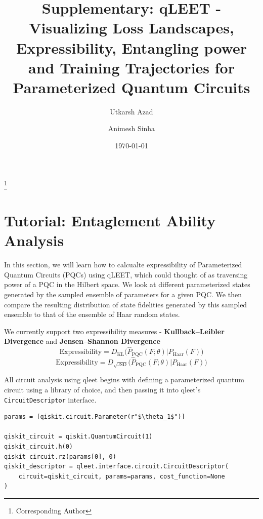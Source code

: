 \documentclass[%
 reprint,
 amsmath,
 amssymb,
 showkeys,
 pra,
 floatfix,
 onecolumn,
]{revtex4-2}
\begin{document}
\title{Supplementary: qLEET - Visualizing Loss Landscapes, Expressibility, Entangling power and Training Trajectories for Parameterized Quantum Circuits}

\author{Utkarsh Azad}
\thanks{Corresponding Author}
\author{Animesh Sinha}
\date{\today}

\maketitle

\section{\label{sec:supl-expressibility-tutorial}Tutorial: Entaglement Ability Analysis}

In this section, we will learn how to calcualte expressibility of Parameterized Quantum Circuits (PQCs) using qLEET, which could thought of as traversing power of a PQC in the Hilbert space. We look at different parameterized states generated by the sampled ensemble of parameters for a given PQC. We then compare the resulting distribution of state fidelities generated by this sampled ensemble to that of the ensemble of Haar random states.

We currently support two expressibility measures - \textbf{Kullback–Leibler Divergence} and \textbf{Jensen–Shannon Divergence}
$$ \textrm{Expressibility} = D_{\textrm{KL}} \Big( \hat{P}_{\textrm{PQC}}(F; \theta) \big\vert P_{\textrm{Haar}}(F) \Big) $$
$$ \textrm{Expressibility} = D_{\sqrt{\textrm{JSD}}} \Big( \hat{P}_{\textrm{PQC}}(F; \theta) \big\vert P_{\textrm{Haar}}(F) \Big) $$

All circuit analysis using qleet begins with defining a parameterized quantum circuit using a library of choice, and then passing it into qleet's \lstinline{CircuitDescriptor} interface.

\begin{lstlisting}
params = [qiskit.circuit.Parameter(r"$\theta_1$")]

qiskit_circuit = qiskit.QuantumCircuit(1)
qiskit_circuit.h(0)
qiskit_circuit.rz(params[0], 0)
qiskit_descriptor = qleet.interface.circuit.CircuitDescriptor(
    circuit=qiskit_circuit, params=params, cost_function=None
)
\end{lstlisting}
\end{document}
